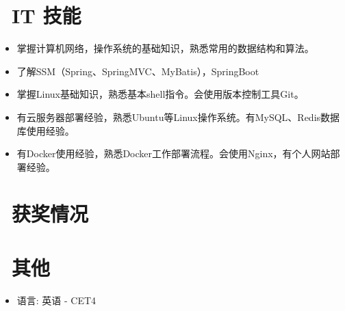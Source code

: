 \documentclass{resume}
\begin{document}
{\section{\faCogs\ IT 技能}
\begin{itemize}[parsep=0.5ex]
  \item 掌握计算机网络，操作系统的基础知识，熟悉常用的数据结构和算法。
  \item 了解SSM（Spring、SpringMVC、MyBatis），SpringBoot
  \item 掌握Linux基础知识，熟悉基本shell指令。会使用版本控制工具Git。
  \item 有云服务器部署经验，熟悉Ubuntu等Linux操作系统。有MySQL、Redis数据库使用经验。
  \item 有Docker使用经验，熟悉Docker工作部署流程。会使用Nginx，有个人网站部署经验。
\end{itemize}

\section{\faHeartO\ 获奖情况}


\section{\faInfo\ 其他}
\begin{itemize}[parsep=0.5ex]
  \item 语言: 英语 - CET4
\end{itemize}

}
%
%
\end{document}
